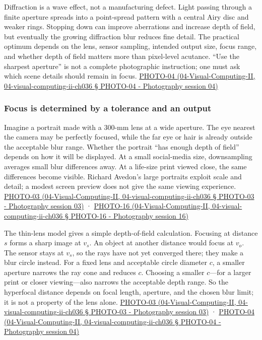 Diffraction is a wave effect, not a manufacturing defect. Light passing through a finite aperture spreads into a point-spread pattern with a central Airy disc and weaker rings. Stopping down can improve aberrations and increase depth of field, but eventually the growing diffraction blur reduces fine detail. The practical optimum depends on the lens, sensor sampling, intended output size, focus range, and whether depth of field matters more than pixel-level acutance. ``Use the sharpest aperture'' is not a complete photographic instruction; one must ask which scene details should remain in focus. \href{}{PHOTO-04 (04-Visual-Computing-II, 04-visual-computing-ii-ch036 § PHOTO-04 - Photography session 04)}

\subsubsection{Focus is determined by a tolerance and an output}\label{focus-is-determined-by-a-tolerance-and-an-output}

Imagine a portrait made with a 300-mm lens at a wide aperture. The eye nearest the camera may be perfectly focused, while the far eye or hair is already outside the acceptable blur range. Whether the portrait ``has enough depth of field'' depends on how it will be displayed. At a small social-media size, downsampling averages small blur differences away. At a life-size print viewed close, the same differences become visible. Richard Avedon's large portraits exploit scale and detail; a modest screen preview does not give the same viewing experience. \href{}{PHOTO-03 (04-Visual-Computing-II, 04-visual-computing-ii-ch036 § PHOTO-03 - Photography session 03)} · \href{}{PHOTO-16 (04-Visual-Computing-II, 04-visual-computing-ii-ch036 § PHOTO-16 - Photography session 16)}

The thin-lens model gives a simple depth-of-field calculation. Focusing at distance \(s\) forms a sharp image at \(v_s\). An object at another distance would focus at \(v_o\). The sensor stays at \(v_s\), so the rays have not yet converged there; they make a blur circle instead. For a fixed lens and acceptable circle diameter \(c\), a smaller aperture narrows the ray cone and reduces \(c\). Choosing a smaller \(c\)---for a larger print or closer viewing---also narrows the acceptable depth range. So the hyperfocal distance depends on focal length, aperture, and the chosen blur limit; it is not a property of the lens alone. \href{}{PHOTO-03 (04-Visual-Computing-II, 04-visual-computing-ii-ch036 § PHOTO-03 - Photography session 03)} · \href{}{PHOTO-04 (04-Visual-Computing-II, 04-visual-computing-ii-ch036 § PHOTO-04 - Photography session 04)}

